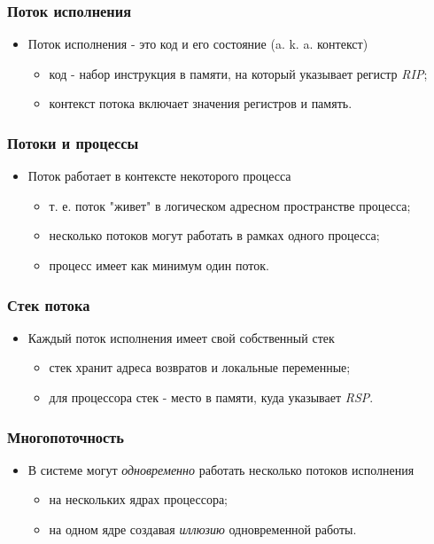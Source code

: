 \begin{frame}
\frametitle{Поток исполнения}
\begin{itemize}
    \item<1->Поток исполнения - это код и его состояние (a. k. a. контекст)
    \begin{itemize}
       \item<2->код - набор инструкция в памяти, на который
       указывает регистр \emph{RIP};
       \item<3->контекст потока включает значения регистров и память.
    \end{itemize}
\end{itemize}
\end{frame}

\begin{frame}
\frametitle{Потоки и процессы}
\begin{itemize}
    \item<1->Поток работает в контексте некоторого процесса
    \begin{itemize}
        \item<2->т. е. поток "живет" в логическом адресном пространстве процесса;
        \item<3->несколько потоков могут работать в рамках одного процесса;
        \item<4->процесс имеет как минимум один поток.
    \end{itemize}
\end{itemize}
\end{frame}

\begin{frame}
\frametitle{Стек потока}
\begin{itemize}
    \item<1->Каждый поток исполнения имеет свой собственный стек
    \begin{itemize}
        \item<2->стек хранит адреса возвратов и локальные переменные;
        \item<3->для процессора стек - место в памяти, куда указывает
        \emph{RSP}.
    \end{itemize}
\end{itemize}
\end{frame}

\begin{frame}
\frametitle{Многопоточность}
\begin{itemize}
    \item<1->В системе могут \emph{одновременно} работать несколько
    потоков исполнения
    \begin{itemize}
        \item<2->на нескольких ядрах процессора;
        \item<3->на одном ядре создавая \emph{иллюзию} одновременной работы.
    \end{itemize}
\end{itemize}
\end{frame}

